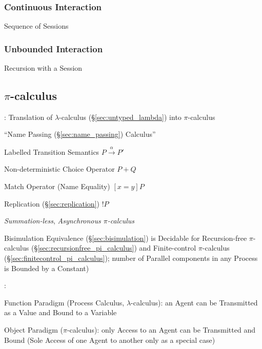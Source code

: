 \subsubsection{Continuous Interaction}\label{sec:continuous_interaction}

Sequence of Sessions



\subsubsection{Unbounded Interaction}\label{sec:unbounded_interaction}

Recursion with a Session



\subsection{$\pi$-calculus}\label{sec:pi_calculus}

\cite{milner-parrow-walker92}

\cite{milner92}: Translation of $\lambda$-calculus
(\S\ref{sec:untyped_lambda}) into $\pi$-calculus

``Name Passing (\S\ref{sec:name_passing}) Calculus''

Labelled Transition Semantics $P \xrightarrow{\alpha} P'$

Non-deterministic Choice Operator $P + Q$

Match Operator (Name Equality) $[x=y]P$

Replication (\S\ref{sec:replication}) $!P$

\emph{Summation-less}, \emph{Asynchronous
  $\pi$-calculus} %
\cite{honda-vasconcelos-kubo98}

Bisimulation Equivalence (\S\ref{sec:bisimulation}) is Decidable for
Recursion-free $\pi$-calculus (\S\ref{sec:recursionfree_pi_calculus})
and Finite-control $\pi$-calculus
(\S\ref{sec:finitecontrol_pi_calculus}); number of Parallel components
in any Process is Bounded by a Constant)

\cite{milner92}:

Function Paradigm (Process Calculus, $\lambda$-calculus): an Agent can
be Transmitted as a Value and Bound to a Variable

Object Paradigm ($\pi$-calculus): only Access to an Agent can be
Transmitted and Bound (Sole Access of one Agent to another only as a
special case)

